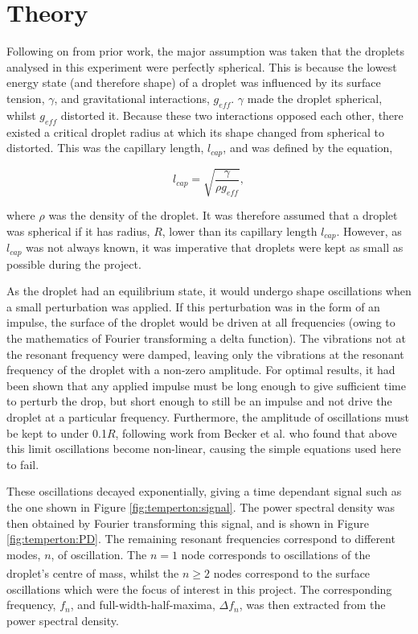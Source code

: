\documentclass{physics_article_B}
\begin{document}
\section{Theory\label{sect:theory}}

    Following on from prior work, the major assumption was taken that the droplets analysed in this experiment were perfectly spherical. This is because the lowest energy state (and therefore shape) of a droplet was influenced by its surface tension, $\gamma$, and gravitational interactions, $g_{eff}$. $\gamma$ made the droplet spherical, whilst $g_{eff}$ distorted it. Because these two interactions opposed each other, there existed a critical droplet radius at which its shape changed from spherical to distorted. This was the capillary length, $l_{cap}$, and was defined by the equation\cite{temperton},
        
        \begin{equation} 
        \label{eq:lcap}
            l_{cap} = \sqrt{\frac{\gamma }{\rho g_{eff} }}, 
        \end{equation}
    
    where $\rho$ was the density of the droplet. It was therefore assumed that a droplet was spherical if it has radius, $R$, lower than its capillary length $l_{cap}$. However, as $l_{cap}$ was not always known, it was imperative that droplets were kept as small as possible during the project. 

    As the droplet had an equilibrium state, it would undergo shape oscillations when a small perturbation was applied\cite{oscillate}. If this perturbation was in the form of an impulse, the surface of the droplet would be driven at all frequencies (owing to the mathematics of Fourier transforming a delta function). The vibrations not at the resonant frequency were damped, leaving only the vibrations at the resonant frequency of the droplet with a non-zero amplitude. For optimal results, it had been shown that any applied impulse must be long enough to give sufficient time to perturb the drop, but short enough to still be an impulse and not drive the droplet at a particular frequency\cite{temperton}. Furthermore, the amplitude of oscillations must be kept to under 0.1$R$, following work from Becker et al. who found that above this limit oscillations become non-linear, causing the simple equations used here to fail\cite{becker}.
    
    These oscillations decayed exponentially, giving a time dependant signal such as the one shown in Figure \ref{fig:temperton:signal}. The power spectral density was then obtained by Fourier transforming this signal, and is shown in Figure \ref{fig:temperton:PD}. The remaining resonant frequencies correspond to different modes, $n$, of oscillation. The $n=1$ node corresponds to oscillations of the droplet's centre of mass\textsuperscript{\cite{miller}}, whilst the $n\geq2$ nodes correspond to the surface oscillations which were the focus of interest in this project. The corresponding frequency, $f_n$, and full-width-half-maxima, $\Delta f_n$, was then extracted from the power spectral density. 
\end{document}
